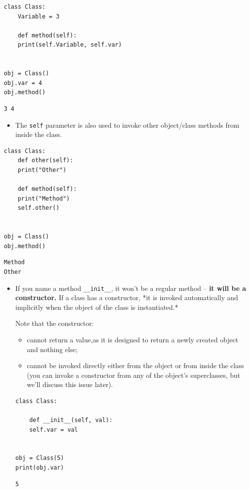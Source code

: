 \documentclass[11pt]{article}
\begin{document}
\begin{verbatim}
class Class:
    Variable = 3

    def method(self):
	print(self.Variable, self.var)


obj = Class()
obj.var = 4
obj.method()
\end{verbatim}

\begin{verbatim}
3 4
\end{verbatim}

\vspace{10 mm}

\begin{itemize}
\item The \texttt{self} parameter is also used to invoke other object/class methods
from inside the class.
\end{itemize}

\begin{verbatim}
class Class:
    def other(self):
	print("Other")

    def method(self):
	print("Method")
	self.other() 


obj = Class()
obj.method()
\end{verbatim}

\begin{verbatim}
Method
Other
\end{verbatim}

\vspace{10 mm}

\begin{itemize}
\item If you name a method \texttt{\_\_init\_\_}, it won’t be a regular method – \textbf{it
will be a constructor.} If a class has a constructor, *it is invoked
automatically and implicitly when the object of the class is
instantiated.*

Note that the constructor:

\begin{itemize}
\item cannot return a value,as it is designed to return a newly created
object and nothing else;

\item cannot be invoked directly either from the object or from inside the
class (you can invoke a constructor from any of the object’s
superclasses, but we’ll discuss this issue later).
\end{itemize}

\begin{verbatim}
class Class:

    def __init__(self, val):
	self.var = val


obj = Class(5)
print(obj.var)
\end{verbatim}

\begin{verbatim}
5
\end{verbatim}
\end{itemize}
\end{document}
